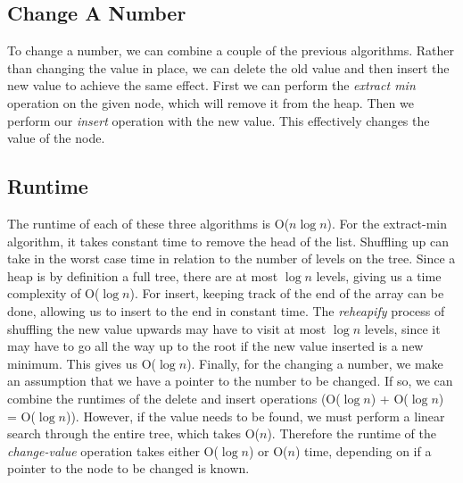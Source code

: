 \documentclass[titlepage]{article}
\numberwithin{equation}{subsection}
\begin{document}
\subsection{Change A Number}
To change a number, we can combine a couple of the previous algorithms. Rather than changing the value in place,
we can delete the old value and then insert the new value to achieve the same effect. First we can perform the 
\textit{extract min} operation on the given node, which will remove it from the heap. Then we perform our
\textit{insert} operation with the new value. This effectively changes the value of the node.
\subsection{Runtime}
The runtime of each of these three algorithms is O($n\log n$). For the extract-min algorithm, it takes
constant time to remove the head of the list. Shuffling up can take in the worst case time in relation to
the number of levels on the tree. Since a heap is by definition a full tree, there are at most $\log n$ levels, 
giving us a time complexity of O($\log n$). For insert, keeping track of the end of the array can be done,
allowing us to insert to the end in constant time. The \textit{reheapify} process of shuffling the new value
upwards may have to visit at most $\log n$ levels, since it may have to go all the way up to the root if the
new value inserted is a new minimum. This gives us O($\log n$). Finally, for the changing a number, we make an
assumption that we have a pointer to the number to be changed. If so, we can combine the runtimes of the delete
and insert operations (O($\log n$) + O($\log n$) = O($\log n$)). However, if the value needs to be found,
we must perform a linear search through the entire tree, which takes O($n$). Therefore the runtime of the
\textit{change-value} operation takes either O($\log n$) or O($n$) time, depending on if a pointer to the
node to be changed is known.
\end{document}
